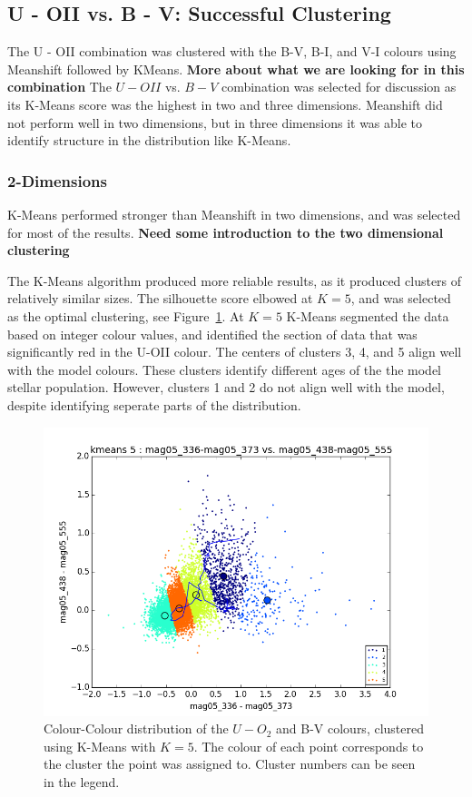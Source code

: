 \subsection{U - OII vs. B - V: Successful Clustering}
The U - OII combination was clustered with the B-V, B-I, and V-I colours using Meanshift followed by KMeans. \textbf{More about what we are looking for in this combination}
The $U - OII$ vs. $B - V$ combination was selected for discussion as its K-Means score was the highest in two and three dimensions.
Meanshift did not perform well in two dimensions, but in three dimensions it was able to identify structure in the distribution like K-Means. 

\subsubsection{2-Dimensions}
K-Means performed stronger than Meanshift in two dimensions, and was selected for most of the results. \textbf{Need some introduction to the two dimensional clustering}

The K-Means algorithm produced more reliable results, as it produced clusters of relatively similar sizes.
The silhouette score elbowed at $K=5$, and was selected as the optimal clustering, see Figure~\ref{fig:UOII2dKM5}.
At $K=5$ K-Means segmented the data based on integer colour values, and identified the section of data that was significantly red in the U-OII colour.
The centers of clusters 3, 4, and 5 align well with the model colours.
These clusters identify different ages of the the model stellar population. However, clusters 1 and 2 do not align well with the model, despite identifying seperate parts of the distribution.

\begin{figure}
\centering
\includegraphics[width=\linewidth]{figs/successful/kmeans_color_5cl_mag05_336-mag05_373vsmag05_438-mag05_555}
\caption{Colour-Colour distribution of the $U-O_{2}$ and B-V colours, clustered using K-Means with $K=5$. The colour of each point corresponds to the cluster the point was assigned to. Cluster numbers can be seen in the legend.}
\label{fig:UOII2dKM5}
\end{figure}

